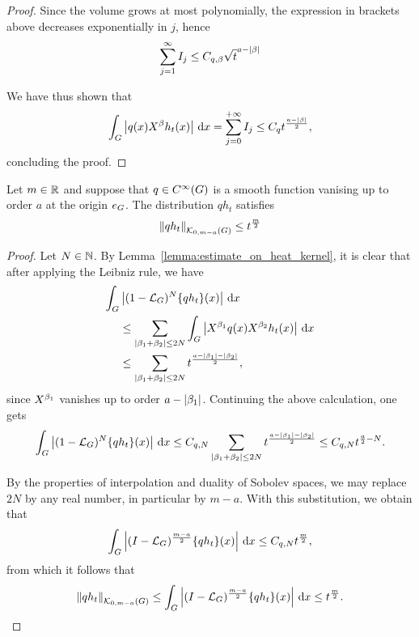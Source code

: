 \begin{proof}
    Since the volume grows at most polynomially,
    the expression in brackets above decreases exponentially in $j$,
    hence
    \begin{align*}
        \sum_{j = 1}^\infty I_j \leq C_{q, \beta} \sqrt t^{a - \abs \beta}
    \end{align*}

    We have thus shown that
    \begin{align*}
        \int_\Group \abs {q(x) \LeftDifferentialOperator \beta h_t(x)} \dd x
        = \sum_{j = 0}^{+\infty} I_j \leq C_q t^{\frac{a - \abs \beta} 2},
    \end{align*}
    concluding the proof.
\end{proof}

\begin{proposition}
    Let $m \in \R$ and suppose that $q \in \SmoothFunctions \Group$ is a smooth function vanising up to order $a$ at the origin $e_\Group$.
    The distribution $q h_t$ satisfies
    \begin{align*}
        \norm [\KernelsSobolev 0 {m - a}] {q h_t}
        \leq t^{\frac m 2}
    \end{align*}
\end{proposition}
\begin{proof}
    Let $N \in \N$.
    By Lemma~\ref{lemma:estimate_on_heat_kernel},
    it is clear that after applying the Leibniz rule,
    we have
    \begin{align*}
        \int_\Group &\abs {(1 - \Laplacian)^N \{q h_t\}(x)} \dd x\\
        &\leq \sum_{\abs{\beta_1 + \beta_2} \leq 2N} \int_\Group \abs {\LeftDifferentialOperator {\beta_1} q(x) \LeftDifferentialOperator {\beta_2} h_t(x)} \dd x\\
        &\leq \sum_{\abs{\beta_1 + \beta_2} \leq 2N} t^{\frac {a - \abs {\beta_1} - \abs{\beta_2}} 2},
    \end{align*}
    since $\LeftDifferentialOperator {\beta_1}$ vanishes up to order $a - \abs {\beta_1}$.
    Continuing the above calculation,
    one gets
    \begin{align*}
        \int_\Group \abs {(1 - \Laplacian)^N \{q h_t\}(x)} \dd x
        \leq C_{q, N} \sum_{\abs{\beta_1 + \beta_2} \leq 2N} t^{\frac {a - \abs {\beta_1} - \abs{\beta_2}} 2}
        \leq C_{q, N} t^{\frac a 2 - N}.
    \end{align*}

    By the properties of interpolation and duality of Sobolev spaces,
    we may replace $2N$ by any real number,
    in particular by $m - a$.
    With this substitution,
    we obtain that
    \begin{align*}
        \int_\Group \abs {\BesselPotential {m - a} \{q h_t\}(x)} \dd x
        \leq C_{q, N} t^{\frac m 2},
    \end{align*}
    from which it follows that
    \begin{align*}
        \norm [\KernelsSobolev 0 {m - a}] {q h_t}
        \leq \int_\Group \abs {\BesselPotential {m - a} \{q h_t\}(x)} \dd x
        \leq t^{\frac m 2}.
    \end{align*}
\end{proof}

